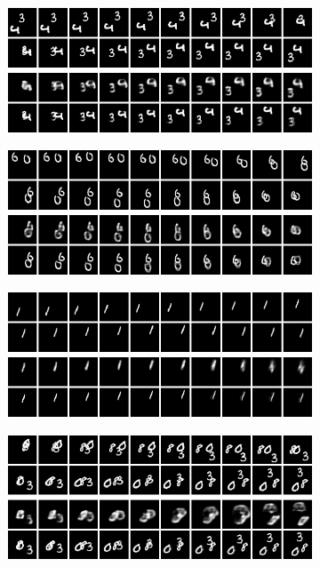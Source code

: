 \begin{figure}[h!tb]
\centering
\begin{subfigure}{0.49\textwidth}
  \centering
  \includegraphics[width=0.92\linewidth]{figures/pred/mm/spec/prediction-00.png}
  \caption{}
  \label{fig:mm-pred-spec-lstm1}
\end{subfigure}%
\begin{subfigure}{0.49\textwidth}
  \centering
  \includegraphics[width=0.92\linewidth]{figures/pred/mm/spec/prediction-01.png}
  \caption{}
  \label{fig:mm-pred-spec-lstm2}
\end{subfigure}
\begin{subfigure}{0.49\textwidth}
  \centering
  \includegraphics[width=0.92\linewidth]{figures/pred/mm/spec/prediction-02.png}
  \caption{}
  \label{fig:mm-pred-spec-lstm3}
\end{subfigure}
\begin{subfigure}{0.49\textwidth}
  \centering
  \includegraphics[width=0.92\linewidth]{figures/pred/mm/spec/prediction-03.png}

\end{subfigure}
\end{figure}
